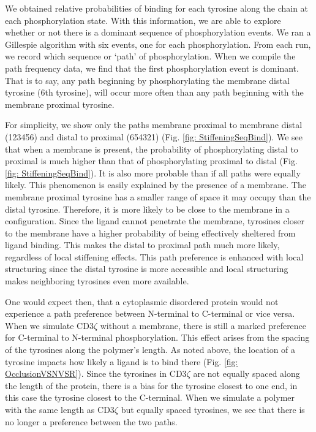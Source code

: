 \documentclass[../../AdvancementSummary.tex]{subfiles}
\begin{document}
We obtained relative probabilities of binding for each tyrosine along the chain at each phosphorylation state. With this information, we are able to explore whether or not there is a dominant sequence of phosphorylation events. We ran a Gillespie algorithm with six events, one for each phosphorylation. From each run, we record which sequence or `path' of phosphorylation. When we compile the path frequency data, we find that the first phosphorylation event is dominant. That is to say, any path beginning by phosphorylating the membrane distal tyrosine (6th tyrosine), will occur more often than any path beginning with the membrane proximal tyrosine. 

For simplicity, we show only the paths membrane proximal to membrane distal (123456) and distal to proximal (654321) (Fig. \ref{fig: StiffeningSeqBind}). We see that when a membrane is present, the probability of phosphorylating distal to proximal is much higher than that of phosphorylating proximal to distal (Fig. \ref{fig: StiffeningSeqBind}). It is also more probable than if all paths were equally likely. This phenomenon is easily explained by the presence of a membrane. The membrane proximal tyrosine has a smaller range of space it may occupy than the distal tyrosine. Therefore, it is more likely to be close to the membrane in a configuration. Since the ligand cannot penetrate the membrane, tyrosines closer to the membrane have a higher probability of being effectively sheltered from ligand binding. This makes the distal to proximal path much more likely, regardless of local stiffening effects. This path preference is enhanced with local structuring since the distal tyrosine is more accessible and local structuring makes neighboring tyrosines even more available.

One would expect then, that a cytoplasmic disordered protein would not experience a path preference between N-terminal to C-terminal or vice versa. When we simulate CD3$\zeta$ without a membrane, there is still a marked preference for C-terminal to N-terminal phosphorylation. This effect arises from the spacing of the tyrosines along the polymer's length. As noted above, the location of a tyrosine impacts how likely a ligand is to bind there (Fig. \ref{fig: OcclusionVSNVSR}). Since the tyrosines in CD3$\zeta$ are not equally spaced along the length of the protein, there is a bias for the tyrosine closest to one end, in this case the tyrosine closest to the C-terminal. When we simulate a polymer with the same length as CD3$\zeta$ but equally spaced tyrosines, we see that there is no longer a preference between the two paths.
\end{document}
